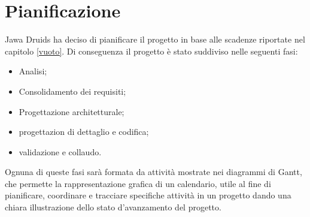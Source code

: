 \chapter{Pianificazione}\label{Pianificazione}
Jawa Druids ha deciso di pianificare il progetto in base alle scadenze riportate nel capitolo \ref{vuoto}. Di conseguenza il progetto è stato suddiviso nelle seguenti fasi:
\begin{itemize}
	\item Analisi;
	\item Consolidamento dei requisiti;
	\item Progettazione architetturale;
	\item progettazion di dettaglio e codifica;
	\item validazione e collaudo.
\end{itemize}
Ognuna di queste fasi sarà formata da attività mostrate nei diagrammi di Gantt, che permette la rappresentazione grafica di un calendario, utile al fine di pianificare, coordinare e tracciare specifiche attività in un progetto dando una chiara illustrazione dello stato d'avanzamento del progetto.
